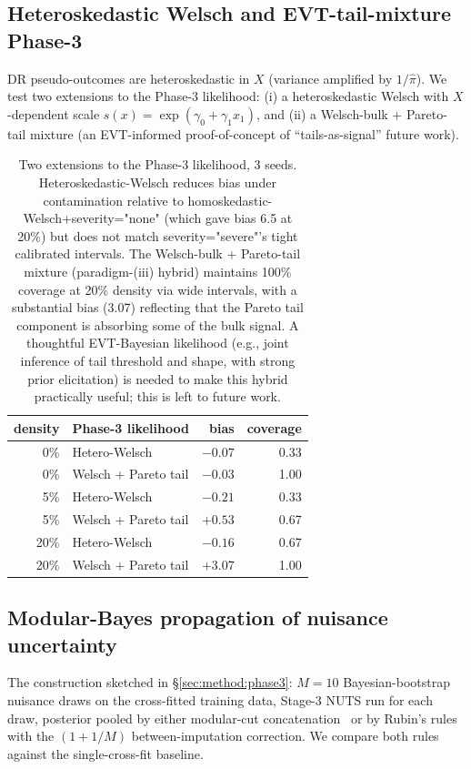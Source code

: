 \subsection{Heteroskedastic Welsch and EVT-tail-mixture Phase-3}
\label{sec:experiments:hetero_evt_phase3}
DR pseudo-outcomes are heteroskedastic in $X$ (variance amplified
by $1/\hat\pi$). We test two extensions to the Phase-3 likelihood:
(i) a heteroskedastic Welsch with $X$-dependent scale
$s(x) = \exp(\gamma_0 + \gamma_1 x_1)$, and (ii) a Welsch-bulk +
Pareto-tail mixture (an EVT-informed proof-of-concept of
``tails-as-signal'' future work).

\begin{table}[!t]
\centering
\small
\begin{tabular}{rlrr}
\toprule
density & Phase-3 likelihood & bias & coverage \\
\midrule
0\%   & Hetero-Welsch         & $-0.07$  & 0.33 \\
0\%   & Welsch + Pareto tail  & $-0.03$  & 1.00 \\
5\%   & Hetero-Welsch         & $-0.21$  & 0.33 \\
5\%   & Welsch + Pareto tail  & $+0.53$  & 0.67 \\
20\%  & Hetero-Welsch         & $-0.16$  & 0.67 \\
20\%  & Welsch + Pareto tail  & $+3.07$  & 1.00 \\
\bottomrule
\end{tabular}
\caption{Two extensions to the Phase-3 likelihood, 3 seeds.
Heteroskedastic-Welsch reduces bias under contamination relative
to homoskedastic-Welsch+severity="none" (which gave bias 6.5 at 20\%)
but does not match severity="severe"'s tight calibrated intervals.
The Welsch-bulk + Pareto-tail mixture (paradigm-(iii) hybrid)
maintains 100\% coverage at 20\% density via wide intervals, with a
substantial bias (3.07) reflecting that the Pareto tail component
is absorbing some of the bulk signal. A thoughtful EVT-Bayesian
likelihood (e.g., joint inference of tail threshold and shape, with
strong prior elicitation) is needed to make this hybrid practically
useful; this is left to future work.}
\label{tab:hetero_evt}
\end{table}

\subsection{Modular-Bayes propagation of nuisance uncertainty}
\label{sec:experiments:nuisance_bootstrap}
The construction sketched in \S\ref{sec:method:phase3}: $M = 10$
Bayesian-bootstrap nuisance draws on the cross-fitted training
data, Stage-3 NUTS run for each draw, posterior pooled by either
modular-cut concatenation~\citep{plummer2015cuts,jacob2017better}
or by Rubin's rules~\citep{rubin1987multiple} with the
$(1 + 1/M)$ between-imputation correction. We compare both rules
against the single-cross-fit baseline.

